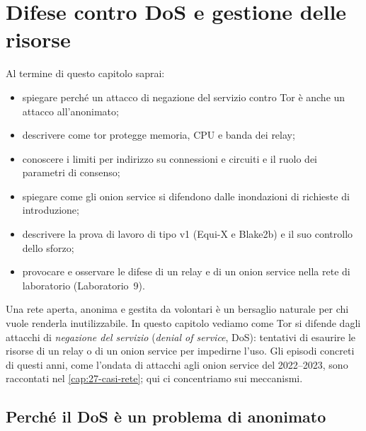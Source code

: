 \chapter{Difese contro DoS e gestione delle risorse}\label{cap:15-dos}

\begin{obiettivi}
Al termine di questo capitolo saprai:
\begin{itemize}[nosep]
  \item spiegare perché un attacco di negazione del servizio contro Tor è anche un attacco all'anonimato;
  \item descrivere come tor protegge memoria, CPU e banda dei relay;
  \item conoscere i limiti per indirizzo su connessioni e circuiti e il ruolo dei parametri di consenso;
  \item spiegare come gli onion service si difendono dalle inondazioni di richieste di introduzione;
  \item descrivere la prova di lavoro di tipo v1 (Equi-X e Blake2b) e il suo controllo dello sforzo;
  \item provocare e osservare le difese di un relay e di un onion service nella rete di laboratorio (Laboratorio~9).
\end{itemize}
\end{obiettivi}

Una rete aperta, anonima e gestita da volontari è un bersaglio naturale per chi vuole renderla inutilizzabile. In questo capitolo vediamo come Tor si difende dagli attacchi di \emph{negazione del servizio} (\emph{denial of service}, DoS): tentativi di esaurire le risorse di un relay o di un onion service per impedirne l'uso. Gli episodi concreti di questi anni, come l'ondata di attacchi agli onion service del 2022--2023, sono raccontati nel \cref{cap:27-casi-rete}; qui ci concentriamo sui meccanismi.

\section{Perché il DoS è un problema di anonimato}\label{sec:dos-anonimato}

